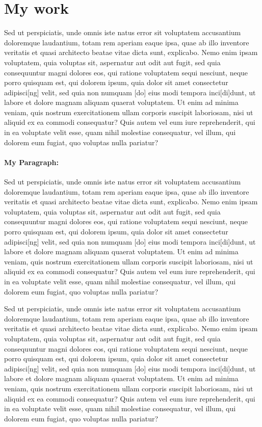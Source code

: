 \documentclass[a4paper,11pt]{article}
\begin{document}
\section{My work}

Sed ut perspiciatis, unde omnis iste natus error sit voluptatem accusantium doloremque laudantium, totam rem aperiam eaque ipsa, quae ab illo inventore veritatis et quasi architecto beatae vitae dicta sunt, explicabo. Nemo enim ipsam voluptatem, quia voluptas sit, aspernatur aut odit aut fugit, sed quia consequuntur magni dolores eos, qui ratione voluptatem sequi nesciunt, neque porro quisquam est, qui dolorem ipsum, quia dolor sit amet consectetur adipisci[ng] velit, sed quia non numquam [do] eius modi tempora inci[di]dunt, ut labore et dolore magnam aliquam quaerat voluptatem. Ut enim ad minima veniam, quis nostrum exercitationem ullam corporis suscipit laboriosam, nisi ut aliquid ex ea commodi consequatur? Quis autem vel eum iure reprehenderit, qui in ea voluptate velit esse, quam nihil molestiae consequatur, vel illum, qui dolorem eum fugiat, quo voluptas nulla pariatur?

\paragraph{My Paragraph:} 
Sed ut perspiciatis, unde omnis iste natus error sit voluptatem accusantium doloremque laudantium, totam rem aperiam eaque ipsa, quae ab illo inventore veritatis et quasi architecto beatae vitae dicta sunt, explicabo. Nemo enim ipsam voluptatem, quia voluptas sit, aspernatur aut odit aut fugit, sed quia consequuntur magni dolores eos, qui ratione voluptatem sequi nesciunt, neque porro quisquam est, qui dolorem ipsum, quia dolor sit amet consectetur adipisci[ng] velit, sed quia non numquam [do] eius modi tempora inci[di]dunt, ut labore et dolore magnam aliquam quaerat voluptatem. Ut enim ad minima veniam, quis nostrum exercitationem ullam corporis suscipit laboriosam, nisi ut aliquid ex ea commodi consequatur? Quis autem vel eum iure reprehenderit, qui in ea voluptate velit esse, quam nihil molestiae consequatur, vel illum, qui dolorem eum fugiat, quo voluptas nulla pariatur?


Sed ut perspiciatis, unde omnis iste natus error sit voluptatem accusantium doloremque laudantium, totam rem aperiam eaque ipsa, quae ab illo inventore veritatis et quasi architecto beatae vitae dicta sunt, explicabo. Nemo enim ipsam voluptatem, quia voluptas sit, aspernatur aut odit aut fugit, sed quia consequuntur magni dolores eos, qui ratione voluptatem sequi nesciunt, neque porro quisquam est, qui dolorem ipsum, quia dolor sit amet consectetur adipisci[ng] velit, sed quia non numquam [do] eius modi tempora inci[di]dunt, ut labore et dolore magnam aliquam quaerat voluptatem. Ut enim ad minima veniam, quis nostrum exercitationem ullam corporis suscipit laboriosam, nisi ut aliquid ex ea commodi consequatur? Quis autem vel eum iure reprehenderit, qui in ea voluptate velit esse, quam nihil molestiae consequatur, vel illum, qui dolorem eum fugiat, quo voluptas nulla pariatur?
\end{document}
